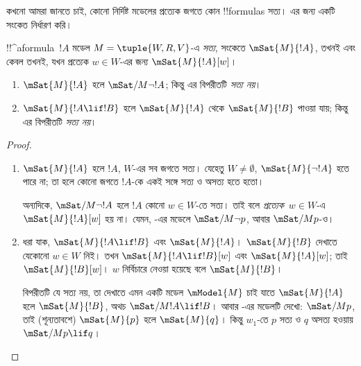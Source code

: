 \documentclass[../../../include/open-logic-section]{subfiles}
\begin{document}


কখনো আমরা জানতে চাই, কোনো নির্দিষ্ট মডেলের প্রত্যেক জগতে কোন !!{formula}s সত্য।
এর জন্য একটি সংকেত নির্ধারণ করি।

\begin{defn}
  !!^a{formula}~$!A$ মডেল $M = \tuple{W, R,
    V}$-এ \emph{সত্য}, সংকেতে $\mSat{M}{!A}$, তখনই এবং কেবল তখনই, যখন
  প্রত্যেক $w \in W$-এর জন্য $\mSat{M}{!A}[w]$।
\end{defn}

\begin{prop}
  \begin{enumerate}
  \item $\mSat{M}{!A}$ হলে $\mSat/{M}{\lnot !A}$; কিন্তু এর বিপরীতটি
    \emph{সত্য নয়}।
  \item $\mSat{M}{!A \lif !B}$ হলে $\mSat{M}{!A}$ থেকে
    $\mSat{M}{!B}$ পাওয়া যায়; কিন্তু এর বিপরীতটি \emph{সত্য নয়}।
  \end{enumerate}
\end{prop}

\begin{proof}
  \begin{enumerate}
  \item $\mSat{M}{!A}$ হলে $!A$, $W$-এর সব জগতে সত্য। যেহেতু
    $W \neq \emptyset$, $\mSat{M}{\lnot!A}$ হতে পারে না; তা হলে কোনো
    জগতে $!A$-কে একই সঙ্গে সত্য ও অসত্য হতে হতো।

    অন্যদিকে, $\mSat/{M}{\lnot !A}$ হলে $!A$ কোনো $w \in W$-তে সত্য।
    তাই বলে \emph{প্রত্যেক}~$w \in W$-এ $\mSat{M}{!A}[w]$ হয় না।
    যেমন, -এর মডেলে $\mSat/{M}{\lnot p}$,
    আবার $\mSat/{M}{p}$-ও।
  \item ধরা যাক, $\mSat{M}{!A \lif !B}$ এবং $\mSat{M}{!A}$।
    $\mSat{M}{!B}$ দেখাতে যেকোনো $w \in W$ নিই। তখন
    $\mSat{M}{!A \lif !B}[w]$ এবং $\mSat{M}{!A}[w]$; তাই
    $\mSat{M}{!B}[w]$। $w$ নির্বিচারে নেওয়া হয়েছে বলে
    $\mSat{M}{!B}$।

    বিপরীতটি যে সত্য নয়, তা দেখাতে এমন একটি মডেল $\mModel{M}$ চাই যাতে
    $\mSat{M}{!A}$ হলে $\mSat{M}{!B}$, অথচ
    $\mSat/{M}{!A \lif !B}$। আবার -এর মডেলটি
    দেখো: $\mSat/{M}{p}$, তাই (শূন্যতাবশে) $\mSat{M}{p}$ হলে
    $\mSat{M}{q}$। কিন্তু $w_1$-তে $p$ সত্য ও $q$ অসত্য হওয়ায়
    $\mSat/{M}{p \lif q}$।
  \end{enumerate}
\end{proof}
\end{document}
